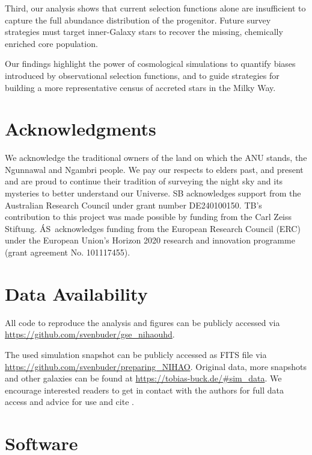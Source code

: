 \documentclass[fleqn,usenatbib]{mnras}
\begin{document}
Third, our analysis shows that current selection functions alone are insufficient to capture the full abundance distribution of the progenitor. Future survey strategies must target inner-Galaxy stars to recover the missing, chemically enriched core population.

Our findings highlight the power of cosmological simulations to quantify biases introduced by observational selection functions, and to guide strategies for building a more representative census of accreted stars in the Milky Way.

\section*{Acknowledgments}

We acknowledge the traditional owners of the land on which the ANU stands, the Ngunnawal and Ngambri people. We pay our respects to elders past, and present and are proud to continue their tradition of surveying the night sky and its mysteries to better understand our Universe. SB acknowledges support from the Australian Research Council under grant number DE240100150.
TB's contribution to this project was made possible by funding from the Carl Zeiss Stiftung. \'{A}S~acknowledges funding from the European Research Council (ERC) under the European Union’s Horizon 2020 research and innovation programme (grant agreement No. 101117455).

\section*{Data Availability}

All code to reproduce the analysis and figures can be publicly accessed via \url{https://github.com/svenbuder/gse_nihaouhd}.

The used simulation snapshot can be publicly accessed as FITS file via \url{https://github.com/svenbuder/preparing_NIHAO}. Original data, more snapshots and other galaxies can be found at \url{https://tobias-buck.de/#sim_data}. We encourage interested readers to get in contact with the authors for full data access and advice for use and cite \citet{Buck2020b, Buck2021}.

\section*{Software}
\end{document}
